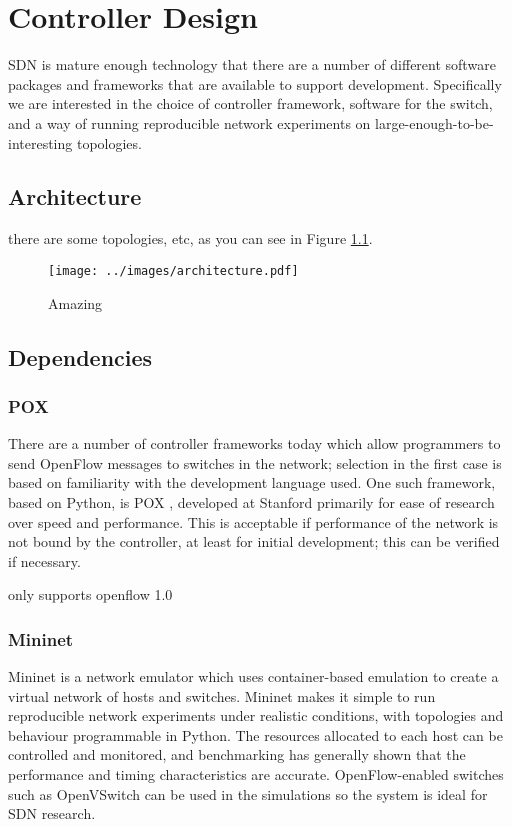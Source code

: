 \chapter{Controller Design}

SDN is mature enough technology that there are a number of different software packages and frameworks that are available to support development. Specifically we are interested in the choice of controller framework, software for the switch, and a way of running reproducible network experiments on large-enough-to-be-interesting topologies.

\section{Architecture}
there are some topologies, etc, as you can see in Figure \ref{fig:arch}.

\begin{landscape}
\begin{figure}[h]
  \centering
  \texttt{[image: ../images/architecture.pdf]}
  \caption{Amazing}
  \label{fig:arch}
\end{figure}
\end{landscape}

\section{Dependencies}
\subsection{POX}
There are a number of controller frameworks today which allow programmers to send OpenFlow messages to switches in the network; selection in the first case is based on familiarity with the development language used. One such framework, based on Python, is POX \cite{onl:pox}, developed at Stanford primarily for ease of research over speed and performance. This is acceptable if performance of the network is not bound by the controller, at least for initial development; this can be verified if necessary.

only supports openflow 1.0

\subsection{Mininet}
Mininet is a network emulator which uses container-based emulation \cite{handigol:mininet} to create a virtual network of hosts and switches. Mininet makes it simple to run reproducible network experiments under realistic conditions, with topologies and behaviour programmable in Python. The resources allocated to each host can be controlled and monitored, and benchmarking \cite{handigol:benchmarks} has generally shown that the performance and timing characteristics are accurate. OpenFlow-enabled switches such as OpenVSwitch can be used in the simulations so the system is ideal for SDN research.

